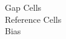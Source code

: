 \documentclass[preview]{standalone}
\begin{document}
Gap Cells\\Reference Cells\\Bias\\
\end{document}
